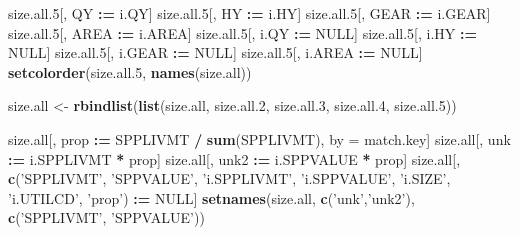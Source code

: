 \documentclass[]{article}
\newenvironment{Shaded}{\begin{snugshade}}{\end{snugshade}}
\newcommand{\KeywordTok}[1]{\textcolor[rgb]{0.13,0.29,0.53}{\textbf{#1}}}
\newcommand{\DecValTok}[1]{\textcolor[rgb]{0.00,0.00,0.81}{#1}}
\newcommand{\StringTok}[1]{\textcolor[rgb]{0.31,0.60,0.02}{#1}}
\newcommand{\OtherTok}[1]{\textcolor[rgb]{0.56,0.35,0.01}{#1}}
\newcommand{\OperatorTok}[1]{\textcolor[rgb]{0.81,0.36,0.00}{\textbf{#1}}}
\newcommand{\ErrorTok}[1]{\textcolor[rgb]{0.64,0.00,0.00}{\textbf{#1}}}
\newcommand{\NormalTok}[1]{#1}
\begin{document}
\begin{Shaded}
\begin{Highlighting}[]
\NormalTok{  size.all.}\DecValTok{5}\NormalTok{[, QY     }\OperatorTok{:}\ErrorTok{=}\StringTok{ }\NormalTok{i.QY]}
\NormalTok{  size.all.}\DecValTok{5}\NormalTok{[, HY     }\OperatorTok{:}\ErrorTok{=}\StringTok{ }\NormalTok{i.HY]}
\NormalTok{  size.all.}\DecValTok{5}\NormalTok{[, GEAR   }\OperatorTok{:}\ErrorTok{=}\StringTok{ }\NormalTok{i.GEAR]}
\NormalTok{  size.all.}\DecValTok{5}\NormalTok{[, AREA   }\OperatorTok{:}\ErrorTok{=}\StringTok{ }\NormalTok{i.AREA]}
\NormalTok{  size.all.}\DecValTok{5}\NormalTok{[, i.QY   }\OperatorTok{:}\ErrorTok{=}\StringTok{ }\OtherTok{NULL}\NormalTok{]}
\NormalTok{  size.all.}\DecValTok{5}\NormalTok{[, i.HY   }\OperatorTok{:}\ErrorTok{=}\StringTok{ }\OtherTok{NULL}\NormalTok{]}
\NormalTok{  size.all.}\DecValTok{5}\NormalTok{[, i.GEAR }\OperatorTok{:}\ErrorTok{=}\StringTok{ }\OtherTok{NULL}\NormalTok{]}
\NormalTok{  size.all.}\DecValTok{5}\NormalTok{[, i.AREA }\OperatorTok{:}\ErrorTok{=}\StringTok{ }\OtherTok{NULL}\NormalTok{]}
  \KeywordTok{setcolorder}\NormalTok{(size.all.}\DecValTok{5}\NormalTok{, }\KeywordTok{names}\NormalTok{(size.all))}
  
\NormalTok{  size.all <-}\StringTok{ }\KeywordTok{rbindlist}\NormalTok{(}\KeywordTok{list}\NormalTok{(size.all, size.all.}\DecValTok{2}\NormalTok{, size.all.}\DecValTok{3}\NormalTok{, }
\NormalTok{                             size.all.}\DecValTok{4}\NormalTok{, size.all.}\DecValTok{5}\NormalTok{))}
  
\NormalTok{  size.all[, prop }\OperatorTok{:}\ErrorTok{=}\StringTok{ }\NormalTok{SPPLIVMT }\OperatorTok{/}\StringTok{ }\KeywordTok{sum}\NormalTok{(SPPLIVMT), by =}\StringTok{ }\NormalTok{match.key]}
\NormalTok{  size.all[, unk  }\OperatorTok{:}\ErrorTok{=}\StringTok{ }\NormalTok{i.SPPLIVMT }\OperatorTok{*}\StringTok{ }\NormalTok{prop]}
\NormalTok{  size.all[, unk2 }\OperatorTok{:}\ErrorTok{=}\StringTok{ }\NormalTok{i.SPPVALUE }\OperatorTok{*}\StringTok{ }\NormalTok{prop]}
\NormalTok{  size.all[, }\KeywordTok{c}\NormalTok{(}\StringTok{'SPPLIVMT'}\NormalTok{, }\StringTok{'SPPVALUE'}\NormalTok{, }\StringTok{'i.SPPLIVMT'}\NormalTok{, }\StringTok{'i.SPPVALUE'}\NormalTok{, }\StringTok{'i.SIZE'}\NormalTok{, }
               \StringTok{'i.UTILCD'}\NormalTok{, }\StringTok{'prop'}\NormalTok{) }\OperatorTok{:}\ErrorTok{=}\StringTok{ }\OtherTok{NULL}\NormalTok{]}
  \KeywordTok{setnames}\NormalTok{(size.all, }\KeywordTok{c}\NormalTok{(}\StringTok{'unk'}\NormalTok{,}\StringTok{'unk2'}\NormalTok{), }\KeywordTok{c}\NormalTok{(}\StringTok{'SPPLIVMT'}\NormalTok{, }\StringTok{'SPPVALUE'}\NormalTok{))}
  

\end{Highlighting}
\end{Shaded}
\end{document}
